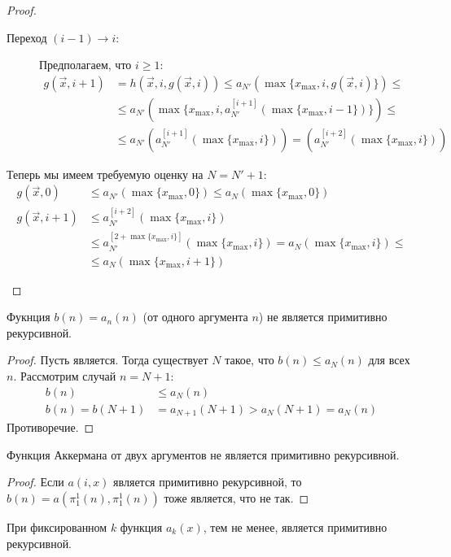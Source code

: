 \begin{proof}
\begin{enumerate}
\begin{description}
			\item[Переход $(i-1) \to i$:]
				Предполагаем, что $i \ge 1$:
				\begin{align*}
					g(\vec x, i + 1)
					&= h(\vec x, i, g(\vec x, i))
					 \le a_{N'}(\max \{ x_{\max}, i, g(\vec x, i) \}) \le \\
					&\le a_{N'}(\max \{ x_{\max}, i, a_{N'}^{[i+1]}(\max\{ x_{\max}, i - 1 \}) \}) \le \\
					&\le a_{N'}(a_{N'}^{[i+1]}(\max\{ x_{\max}, i \}))
					   = (a_{N'}^{[i+2]}(\max\{ x_{\max}, i \}))
				\end{align*}
		\end{description}

		Теперь мы имеем требуемую оценку на $N=N'+1$:
		\begin{align*}
			g(\vec x, 0) &\le a_{N'}(\max \{ x_{\max}, 0 \}) \le a_N(\max \{ x_{\max}, 0 \}) \\
			g(\vec x, i + 1)
			&\le a_{N'}^{[i+2]}(\max \{ x_{\max}, i \}) \\
			&\le a_{N'}^{[2 + \max \{ x_{\max}, i \}]}(\max \{ x_{\max}, i \})
			   = a_N(\max \{ x_{\max}, i \}) \le \\
			&\le a_N(\max \{ x_{\max}, i + 1 \})
		\end{align*}
	\end{enumerate}
\end{proof}

\begin{conseq}
	Фукнция $b(n)=a_n(n)$ (от одного аргумента $n$) не является примитивно рекурсивной.
\end{conseq}
\begin{proof}
	Пусть является.
	Тогда существует $N$ такое, что $b(n) \le a_N(n)$ для всех $n$.
	Рассмотрим случай $n=N+1$:
	\begin{align*}
		b(n) &\le a_N(n) \\
		b(n) = b(N+1) &= a_{N+1}(N+1) > a_N(N+1) = a_N(n)
	\end{align*}
	Противоречие.
\end{proof}

\begin{conseq}
	Функция Аккермана от двух аргументов не является примитивно рекурсивной.
\end{conseq}
\begin{proof}
	Если $a(i, x)$ является примитивно рекурсивной, то $b(n)=a(\pi_1^1(n), \pi_1^1(n))$ тоже является, что не так.
\end{proof}

\begin{Exercise}
	При фиксированном $k$ функция $a_k(x)$, тем не менее, является примитивно рекурсивной.
\end{Exercise}
